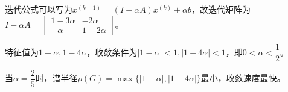    \begin{solution}
        迭代公式可以写为$x^{(k+1)}=(I-\alpha A)x^{(k)}+\alpha b$，故迭代矩阵为$I-\alpha A=\begin{bmatrix}1-3\alpha&-2\alpha\\-\alpha &1-2\alpha\end{bmatrix}$。

        特征值为$1-\alpha,1-4\alpha$，收敛条件为$|1-\alpha|<1,|1-4\alpha|<1$，即$0<\alpha<\dfrac12$。

        当$\alpha=\dfrac25$时，谱半径$\rho(G)=\max\{|1-\alpha|,|1-4\alpha|\}$最小，收敛速度最快。
    \end{solution}

